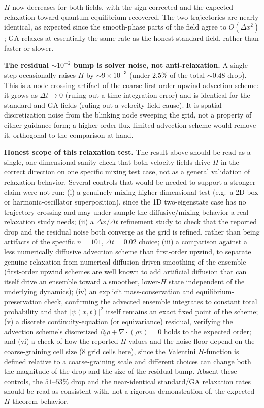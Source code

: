 \documentclass[11pt]{article}
\begin{document}
$H$ now decreases for both fields, with the sign corrected and the expected relaxation toward quantum equilibrium recovered. The two trajectories are nearly identical, as expected since the smooth-phase parts of the field agree to $O(\Delta x^2)$; GA relaxes at essentially the same rate as the honest standard field, rather than faster or slower.

\textbf{The residual $\sim10^{-2}$ bump is solver noise, not anti-relaxation.} A single step occasionally raises $H$ by $\sim9\times10^{-3}$ (under $2.5\%$ of the total $\sim0.48$ drop). This is a node-crossing artifact of the coarse first-order upwind advection scheme: it grows as $\Delta t\to0$ (ruling out a time-integration error) and is identical for the standard and GA fields (ruling out a velocity-field cause). It is spatial-discretization noise from the blinking node sweeping the grid, not a property of either guidance form; a higher-order flux-limited advection scheme would remove it, orthogonal to the comparison at hand.

\textbf{Honest scope of this relaxation test.} The result above should be read as a single, one-dimensional sanity check that both velocity fields drive $H$ in the correct direction on one specific mixing test case, not as a general validation of relaxation behavior. Several controls that would be needed to support a stronger claim were not run: (i) a genuinely mixing higher-dimensional test (e.g.\ a 2D box or harmonic-oscillator superposition), since the 1D two-eigenstate case has no trajectory crossing and may under-sample the diffusive/mixing behavior a real relaxation study needs; (ii) a $\Delta x$/$\Delta t$ refinement study to check that the reported drop and the residual noise both converge as the grid is refined, rather than being artifacts of the specific $n=101$, $\Delta t=0.02$ choice; (iii) a comparison against a less numerically diffusive advection scheme than first-order upwind, to separate genuine relaxation from numerical-diffusion-driven smoothing of the ensemble (first-order upwind schemes are well known to add artificial diffusion that can itself drive an ensemble toward a smoother, lower-$H$ state independent of the underlying dynamics); (iv) an explicit mass-conservation and equilibrium-preservation check, confirming the advected ensemble integrates to constant total probability and that $|\psi(x,t)|^2$ itself remains an exact fixed point of the scheme; (v) a discrete continuity-equation (or equivariance) residual, verifying the advection scheme's discretized $\partial_t\rho+\nabla\cdot(\rho v)=0$ holds to the expected order; and (vi) a check of how the reported $H$ values and the noise floor depend on the coarse-graining cell size ($8$ grid cells here), since the Valentini $H$-function is defined relative to a coarse-graining scale and different choices can change both the magnitude of the drop and the size of the residual bump. Absent these controls, the $51$--$53\%$ drop and the near-identical standard/GA relaxation rates should be read as consistent with, not a rigorous demonstration of, the expected $H$-theorem behavior.
\end{document}
